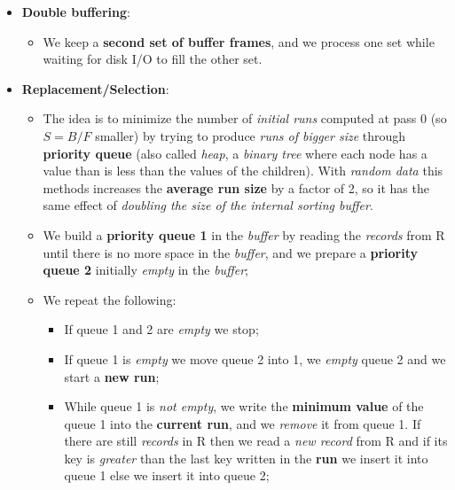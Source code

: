 \documentclass{article}
\begin{document}
\begin{itemize}
\item \textbf{Double buffering}:
\begin {itemize}
\item We keep a \textbf{second set of buffer frames}, and we process one set while waiting for disk I/O to fill the other set.
\end{itemize}
\item \textbf{Replacement/Selection}:
\begin{itemize}
\item The idea is to minimize the number of \emph{initial runs} computed at pass 0 (so $S = B/F$ smaller) by trying to produce \emph{runs of bigger size} through \textbf{priority queue} (also called \emph{heap}, a \emph{binary tree} where each node has a value than is less than the values of the children). With \emph{random data} this methods increases the \textbf{average run size} by a factor of 2, so it has the same effect of \emph{doubling the size of the internal sorting buffer}. 
\item We build a \textbf{priority queue 1} in the \emph{buffer} by reading the \emph{records} from R until there is no more space in the \emph{buffer}, and we prepare a \textbf{priority queue 2} initially \emph{empty} in the \emph{buffer};
\item We repeat the following:
\begin{itemize}
\item If queue 1 and 2 are \emph{empty} we stop;
\item If queue 1 is \emph{empty} we move queue 2 into 1, we \emph{empty} queue 2 and we start a \textbf{new run};
\item While queue 1 is \emph{not empty}, we write the \textbf{minimum value} of the queue 1 into the \textbf{current run}, and we \emph{remove} it from queue 1. If there are still \emph{records} in R then we read a \emph{new record} from R and if its key is \emph{greater} than the last key written in the \textbf{run} we insert it into queue 1 else we insert it into queue 2;
\end{itemize}
\end{itemize}
\end{itemize}
\clearpage
\end{document}
